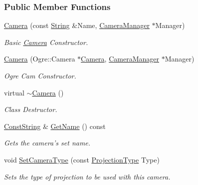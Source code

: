 \subsubsection*{Public Member Functions}
\begin{DoxyCompactItemize}
\item 
\hyperlink{classphys_1_1Camera_a863e7b7a0fb4db7969014d8391b5ca30}{Camera} (const \hyperlink{namespacephys_aa03900411993de7fbfec4789bc1d392e}{String} \&Name, \hyperlink{classphys_1_1CameraManager}{CameraManager} $\ast$Manager)
\begin{DoxyCompactList}\small\item\em Basic \hyperlink{classphys_1_1Camera}{Camera} Constructor. \item\end{DoxyCompactList}\item 
\hyperlink{classphys_1_1Camera_a0510d4f9bf6fb195115272cbd116e8dd}{Camera} (Ogre::Camera $\ast$\hyperlink{classphys_1_1Camera}{Camera}, \hyperlink{classphys_1_1CameraManager}{CameraManager} $\ast$Manager)
\begin{DoxyCompactList}\small\item\em Ogre Cam Constructor. \item\end{DoxyCompactList}\item 
virtual \hyperlink{classphys_1_1Camera_aa45f340a6f7ba0970aa2602a928463ea}{$\sim$Camera} ()
\begin{DoxyCompactList}\small\item\em Class Destructor. \item\end{DoxyCompactList}\item 
\hyperlink{namespacephys_a5ce5049f8b4bf88d6413c47b504ebb31}{ConstString} \& \hyperlink{classphys_1_1Camera_ae24490b8589796cb5f51d291cc418d84}{GetName} () const 
\begin{DoxyCompactList}\small\item\em Gets the camera's set name. \item\end{DoxyCompactList}\item 
void \hyperlink{classphys_1_1Camera_a95d04ee7482ae6670229f59d63ee8926}{SetCameraType} (const \hyperlink{classphys_1_1Camera_a87d8d46e9eb2080b10712079be69d86a}{ProjectionType} Type)
\begin{DoxyCompactList}\small\item\em Sets the type of projection to be used with this camera. \item\end{DoxyCompactList}\item 

\end{DoxyCompactItemize}
